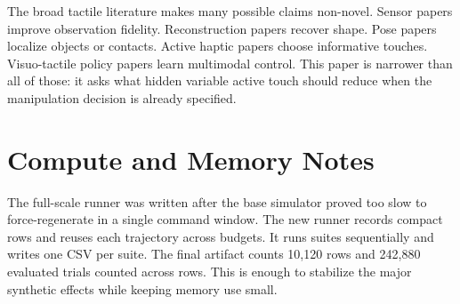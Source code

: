 \documentclass{article}
\begin{document}
The broad tactile literature makes many possible claims non-novel. Sensor papers improve observation fidelity. Reconstruction papers recover shape. Pose papers localize objects or contacts. Active haptic papers choose informative touches. Visuo-tactile policy papers learn multimodal control. This paper is narrower than all of those: it asks what hidden variable active touch should reduce when the manipulation decision is already specified.

\begin{table}[h]
\centering
\caption{Literature-boundary map.}
\label{tab:litboundary}
\end{table}

\section{Compute and Memory Notes}

The full-scale runner was written after the base simulator proved too slow to force-regenerate in a single command window. The new runner records compact rows and reuses each trajectory across budgets. It runs suites sequentially and writes one CSV per suite. The final artifact counts 10,120 rows and 242,880 evaluated trials counted across rows. This is enough to stabilize the major synthetic effects while keeping memory use small.
\end{document}
